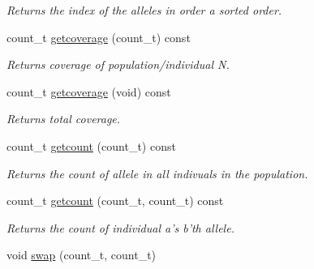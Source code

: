 \begin{DoxyCompactItemize}
\begin{DoxyCompactList}\small\item\em Returns the index of the alleles in order a sorted order. \end{DoxyCompactList}\item 
\hypertarget{classLocus_a74a6a4a9b5821ed310759a61c99ffb23}{count\-\_\-t \hyperlink{classLocus_a74a6a4a9b5821ed310759a61c99ffb23}{getcoverage} (count\-\_\-t) const }\label{classLocus_a74a6a4a9b5821ed310759a61c99ffb23}

\begin{DoxyCompactList}\small\item\em Returns coverage of population/individual N. \end{DoxyCompactList}\item 
\hypertarget{classLocus_a6b8241285e0abdb51fabf30e95a2af14}{count\-\_\-t \hyperlink{classLocus_a6b8241285e0abdb51fabf30e95a2af14}{getcoverage} (void) const }\label{classLocus_a6b8241285e0abdb51fabf30e95a2af14}

\begin{DoxyCompactList}\small\item\em Returns total coverage. \end{DoxyCompactList}\item 
\hypertarget{classLocus_a7eb8ac8782d6bf39da9cce900fc7e1b2}{count\-\_\-t \hyperlink{classLocus_a7eb8ac8782d6bf39da9cce900fc7e1b2}{getcount} (count\-\_\-t) const }\label{classLocus_a7eb8ac8782d6bf39da9cce900fc7e1b2}

\begin{DoxyCompactList}\small\item\em Returns the count of allele in all indivuals in the population. \end{DoxyCompactList}\item 
\hypertarget{classLocus_a15593537ffd1282834d7b97da48fb419}{count\-\_\-t \hyperlink{classLocus_a15593537ffd1282834d7b97da48fb419}{getcount} (count\-\_\-t, count\-\_\-t) const }\label{classLocus_a15593537ffd1282834d7b97da48fb419}

\begin{DoxyCompactList}\small\item\em Returns the count of individual a's b'th allele. \end{DoxyCompactList}\item 
\hypertarget{classLocus_af20da70ee14daf43d2fb00516f9e027c}{void \hyperlink{classLocus_af20da70ee14daf43d2fb00516f9e027c}{swap} (count\-\_\-t, count\-\_\-t)}\label{classLocus_af20da70ee14daf43d2fb00516f9e027c}


\end{DoxyCompactItemize}
